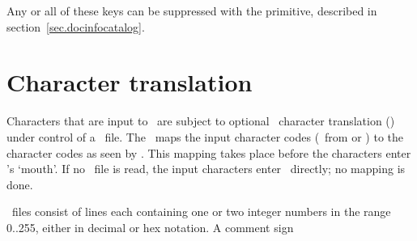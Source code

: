 \documentclass{pdftexmanual}
\begin{document}
Any or all of these keys can be suppressed with the
 primitive, described in
section~\ref{sec.docinfocatalog}.

\chapter{Character translation}

Characters that are input to \PDFTEX\ are subject to optional \TEX\
character translation (\TCX) under control of a \TCX\ file. The \TCX\
maps the input character codes (\eg\ from  or ) to
the character codes as seen by \PDFTEX. This mapping takes place before
the characters enter \PDFTEX's `mouth'. If no \TCX\ file is read, the
input characters enter \PDFTEX\ directly; no mapping is done.

\TCX\ files consist of lines each containing one or two integer numbers
in the range 0..255, either in decimal or hex notation. A comment sign
\end{document}
